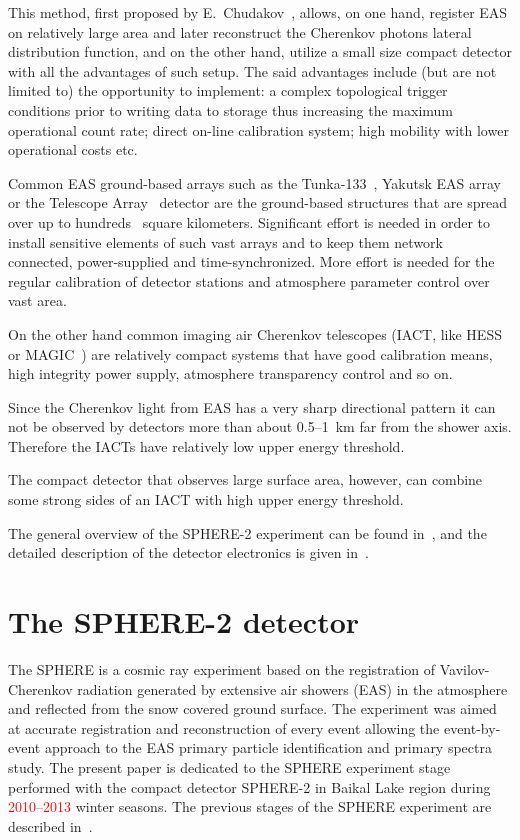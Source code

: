 \documentclass[final,5p,times,twocolumn]{elsarticle}
\begin{document}
This method, first proposed by E.~Chudakov~\cite{chu74}, allows, on one hand, register EAS on relatively large area and later reconstruct the Cherenkov photons lateral distribution function, and on the other hand, utilize a small size compact detector with all the advantages of such setup. The said advantages include (but are not limited to) the opportunity to implement: a complex topological trigger conditions prior to writing data to storage thus increasing the maximum operational count rate; direct on-line calibration system; high mobility with lower operational costs etc.

Common EAS ground-based arrays such as the Tunka-133~\cite{}, Yakutsk EAS array~\cite{} or the Telescope Array~\cite{abu12} detector are the ground-based structures that are spread over up to hundreds~\cite{abu12} square kilometers. Significant effort is needed in order to install sensitive elements of such vast arrays and to keep them network connected, power-supplied and time-synchronized. More effort is needed for the regular calibration of detector stations and atmosphere parameter control over vast area. 

On the other hand common imaging air Cherenkov telescopes (IACT, like HESS~\cite{} or MAGIC~\cite{}) are relatively compact systems that have good calibration means, high integrity power supply, atmosphere transparency control and so on.

Since the Cherenkov light from EAS has a very sharp directional pattern it can not be observed by detectors more than about 0.5--1~km far from the shower axis. Therefore the IACTs have relatively low upper energy threshold.

The compact detector that observes large surface area, however, can combine some strong sides of an IACT with high upper energy threshold. 

The general overview of the SPHERE-2 experiment can be found in~\cite{Ant15a}, and the detailed description of the detector electronics is given in~\cite{Ant20}.


\section{The SPHERE-2 detector \label{sect:detector}}
The SPHERE is a cosmic ray experiment based on the registration of Vavilov-Cherenkov radiation generated by extensive air showers (EAS) in the atmosphere and reflected from the snow covered ground surface. The experiment was aimed at accurate registration and reconstruction of every event allowing the event-by-event approach to the EAS primary particle identification and primary spectra study. The present paper is dedicated to the SPHERE experiment stage performed with the compact detector SPHERE-2 in Baikal Lake region during \textcolor{red}{2010--2013} winter seasons. The previous stages of the SPHERE experiment are described in~\cite{Ant15a}. %
\end{document}
